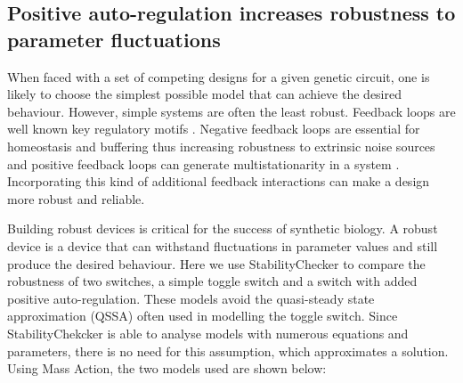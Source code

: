 \newpage
\subsection{Positive auto-regulation increases robustness to parameter fluctuations}

When faced with a set of competing designs for a given genetic circuit, one is likely to choose the simplest possible model that can achieve the desired behaviour. However, simple systems are often the least robust. Feedback loops are well known key regulatory motifs \autocite{Brandman:2005ci}. Negative feedback loops are essential for homeostasis and buffering \autocite{Thomas:1995id} thus increasing robustness to extrinsic noise sources and positive feedback loops can generate multistationarity in a system \autocite{Thomas:1995id}. Incorporating this kind of additional feedback interactions can make a design more robust and reliable. 

Building robust devices is critical for the success of synthetic biology. A robust device is a device that can withstand fluctuations in parameter values and still produce the desired behaviour. Here we use StabilityChecker to compare the robustness of two switches, a simple toggle switch and a switch with added positive auto-regulation. These models avoid the quasi-steady state approximation (QSSA) often used in modelling the toggle switch. Since StabilityChekcker is able to analyse models with numerous equations and parameters, there is no need for this assumption, which approximates a solution. Using Mass Action, the two models used are shown below:


